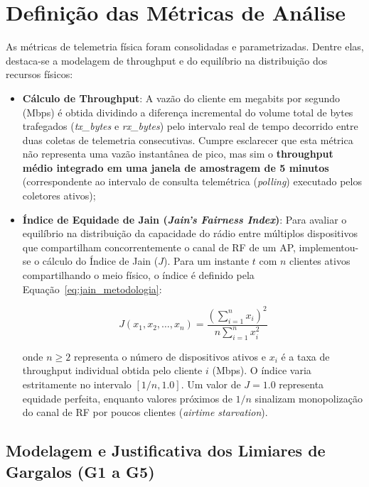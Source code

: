 \section{Definição das Métricas de Análise}
\label{sec:metodologia_metricas}

As métricas de telemetria física foram consolidadas e parametrizadas. Dentre elas, destaca-se a modelagem de throughput e do equilíbrio na distribuição dos recursos físicos:
\begin{itemize}
	\item \textbf{Cálculo de Throughput}: A vazão do cliente em megabits por segundo (Mbps) é obtida dividindo a diferença incremental do volume total de bytes trafegados (\textit{tx\_bytes} e \textit{rx\_bytes}) pelo intervalo real de tempo decorrido entre duas coletas de telemetria consecutivas. Cumpre esclarecer que esta métrica não representa uma vazão instantânea de pico, mas sim o \textbf{throughput médio integrado em uma janela de amostragem de 5 minutos} (correspondente ao intervalo de consulta telemétrica (\textit{polling}) executado pelos coletores ativos);
	\item \textbf{Índice de Equidade de Jain (\textit{Jain's Fairness Index})}: Para avaliar o equilíbrio na distribuição da capacidade do rádio entre múltiplos dispositivos que compartilham concorrentemente o canal de RF de um AP, implementou-se o cálculo do Índice de Jain ($J$). Para um instante $t$ com $n$ clientes ativos compartilhando o meio físico, o índice é definido pela Equação~\ref{eq:jain_metodologia}:

	\begin{equation}
	\label{eq:jain_metodologia}
	J(x_1, x_2, \dots, x_n) = \frac{\left( \sum_{i=1}^{n} x_i \right)^2}{n \sum_{i=1}^{n} x_i^2}
	\end{equation}

	onde $n \ge 2$ representa o número de dispositivos ativos e $x_i$ é a taxa de throughput individual obtida pelo cliente $i$ (Mbps). O índice varia estritamente no intervalo $[1/n, 1.0]$. Um valor de $J = 1.0$ representa equidade perfeita, enquanto valores próximos de $1/n$ sinalizam monopolização do canal de RF por poucos clientes (\textit{airtime starvation}).
\end{itemize}

\subsection{Modelagem e Justificativa dos Limiares de Gargalos (G1 a G5)}
\label{subsec:metodologia_gargalos_justificativa}

